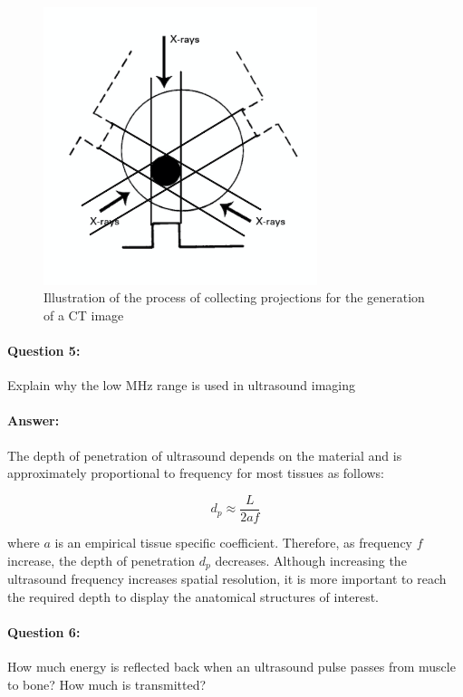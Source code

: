 \documentclass[12pt, letter]{article}
\begin{document}
\begin{figure}%
    \centering
    \includegraphics[width=8cm]{backproject_ct.png}
    \caption{Illustration of the process of collecting projections for the generation of a CT image}
    \label{fig:backproj}%
\end{figure}

\paragraph{Question 5: } Explain why the low MHz range is used in ultrasound imaging

\paragraph{Answer: } The depth of penetration of ultrasound depends on the material and is approximately proportional to frequency for most tissues as follows:

\begin{equation}
    d_p \approx \frac{L}{2af}
\end{equation}

where $a$ is an empirical tissue specific coefficient. Therefore, as frequency $f$ increase, the depth of penetration $d_p$ decreases. Although increasing the ultrasound frequency increases spatial resolution, it is more important to reach the required depth to display the anatomical structures of interest.

\paragraph{Question 6:} How much energy is reflected back when an ultrasound pulse passes from muscle to bone? How much is transmitted?
\end{document}
